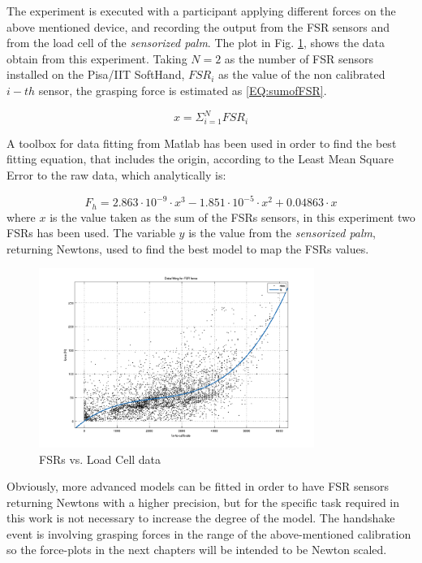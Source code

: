 The experiment is executed with a participant applying different forces on the above mentioned device, and recording the output from the FSR sensors and from the load cell of the \textit{sensorized palm}.
The plot in Fig. \ref{Fig:FSRcalibratedModel}, shows the data obtain from this experiment.
Taking $N=2$ as the number of FSR sensors installed on the Pisa/IIT SoftHand, $FSR_{i}$ as the value of the non calibrated $i-th$ sensor, the grasping force is estimated as \ref{EQ:sumofFSR}.

\begin{equation}
x = \Sigma_{i=1}^{N} FSR_{i} 
\label{EQ:sumofFSR}
\end{equation}

A toolbox for data fitting from Matlab has been used in order to find the best fitting equation, that includes the origin, according to the Least Mean Square Error to the raw data, which analytically is:

\begin{equation}
F_{h} = 2.863 \cdot 10^{-9}\cdot x^3 - 1.851 \cdot 10^{-5} \cdot x^2 + 0.04863 \cdot x 
\end{equation}
where $x$ is the value taken as the sum of the FSRs sensors, in this experiment two FSRs has been used.
The variable $y$ is the value from the \textit{sensorized palm}, returning Newtons, used to find the best model to map the FSRs values.

 
\begin{figure}[ht]
\centering
\includegraphics[width=0.8\textwidth]{Figure/fsrtodummy.png}
\caption{FSRs vs. Load Cell data}
\label{Fig:FSRcalibratedModel}
\end{figure}

Obviously, more advanced models can be fitted in order to have FSR sensors returning Newtons with a higher precision, but for the specific task required in this work is not necessary to increase the degree of the model. The handshake event is involving grasping forces in the range of the above-mentioned calibration so the force-plots in the next chapters will be intended to be Newton scaled. 

